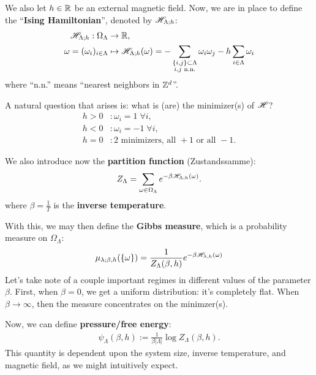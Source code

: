 \documentclass{article}
\begin{document}
We also let $h \in \mathbb{R}$ be an external magnetic field. Now, we are in place to define the ``\textbf{Ising Hamiltonian}'', denoted by $\mathscr{H}_{\Lambda; h}$:
\begin{align*}
  \mathscr{H}_{\Lambda; h} : \Omega_{\Lambda} &\rightarrow \mathbb{R}, \\
  \omega = (\omega_i)_{i \in \Lambda} &\mapsto \mathscr{H}_{\Lambda;h}(\omega) = {-} \sum\limits_{\substack{\{i, j\} \subset \Lambda \\ i, j \text{ n.n.}}} \omega_i \omega_j - h \sum\limits_{i \in \Lambda} \omega_i
\end{align*}
where ``n.n.'' means ``nearest neighbors in $\mathbb{Z}^d$''.

A natural question that arises is: what is (are) the minimizer(s) of $\mathscr{H}$?
\begin{align*}
  h > 0 &: \omega_i = 1 \; \forall i,\\
  h < 0 &: \omega_i = -1 \; \forall i, \\
  h = 0 &: 2 \text{ minimizers, all } +1 \text{ or all } -1.
\end{align*}

We also introduce now the \textbf{partition function} (Zustandssamme):
\begin{eqnarray}
\label{eq:2}
Z_{\Lambda} = \sum\limits_{\omega\in\Omega_{\Lambda}} e^{-\beta\mathscr{H}_{\Lambda;h}(\omega)}.
\end{eqnarray}
where $\beta = \frac{1}{T}$ is the \textbf{inverse temperature}.

With this, we may then define the \textbf{Gibbs measure}, which is a probability measure on $\Omega_{\Lambda}$:
\begin{eqnarray}
\label{eq:1}
\mu_{\lambda;\beta,h}(\{\omega\}) = \frac{1}{Z_{\Lambda}(\beta,h)} e^{-\beta\mathscr{H}_{\lambda;h}(\omega)}
\end{eqnarray}
Let's take note of a couple important regimes in different values of the parameter $\beta$. First, when $\beta = 0$, we get a uniform distribution: it's completely flat. When $\beta \to \infty$, then the measure concentrates on the minimzer(s).

Now, we can define \textbf{pressure/free energy}:
\begin{eqnarray}
\label{eq:3}
  \psi_{\Lambda}(\beta,h) := \frac{1}{\beta|\Lambda|}\log Z_{\Lambda} (\beta, h).
\end{eqnarray}
This quantity is dependent upon the system size, inverse temperature, and magnetic field, as we might intuitively expect.
\end{document}
